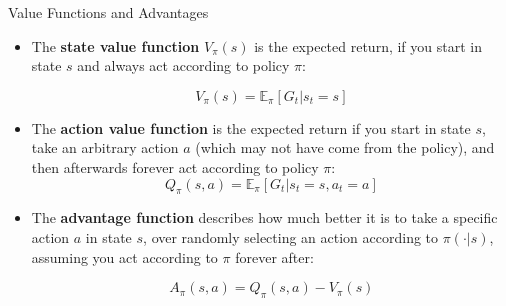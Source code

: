 \documentclass[8pt]{beamer}
\begin{document}
\begin{frame}{Value Functions and Advantages}

\begin{itemize}

    \item The \textbf{state value function} $V_\pi(s)$ is the expected return, if you start in state $s$ and always act according to policy $\pi$:

    \begin{equation}
    V_{\pi}(s) = \mathbb{E}_{\pi}\left[G_t| s_t = s\right]
    \end{equation}

    \item The \textbf{action value function} is the expected return if you start in state $s$, take an arbitrary action $a$ (which may not have come from the policy), and then afterwards forever act according to policy $\pi$:
    \begin{equation}
    Q_\pi(s, a) = \mathbb{E}_{\pi} \left[G_t| s_t = s, a_t = a\right]
    \end{equation}

    \item The \textbf{advantage function} describes how much better it is to take a specific action $a$ in state $s$, over randomly selecting an action according to $\pi(\cdot|s)$, assuming you act according to $\pi$ forever after:

    \begin{equation}
    A_\pi(s, a) = Q_\pi(s, a) - V_\pi(s)
    \end{equation}

\end{itemize}
    
\end{frame}
\end{document}
